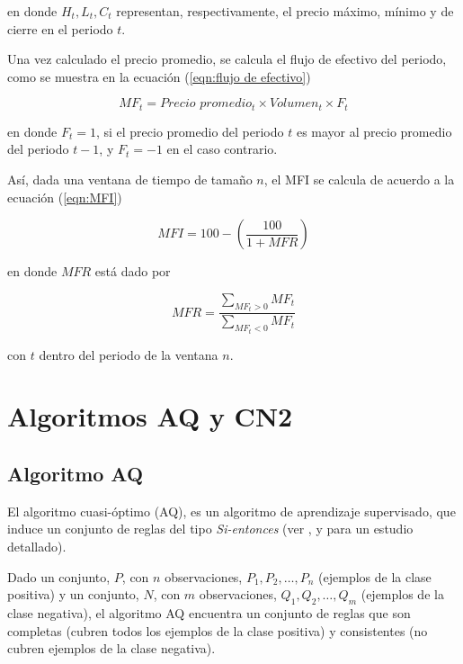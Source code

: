 \documentclass[12pt]{scrbook}
\theoremstyle{break}
\theoremstyle{break}
\begin{document}
en donde $H_{t}, L_t, C_t$ representan, respectivamente, el precio máximo, mínimo y de cierre en el periodo $t$.

Una vez calculado el precio promedio, se calcula el flujo de efectivo del periodo, como se muestra en la ecuación (\ref{eqn:flujo de efectivo})

\begin{equation} \label{eqn:flujo de efectivo}
MF_t = Precio\, \, promedio_t \times Volumen_t \times F_t
\end{equation}

en donde $F_t = 1$, si el precio promedio del periodo $t$ es mayor al precio promedio del periodo $t-1$, y $F_t = -1$ en el caso contrario.

Así, dada una ventana de tiempo de tamaño $n$, el MFI se calcula de acuerdo a la ecuación (\ref{eqn:MFI})

\begin{equation} \label{eqn:MFI}
MFI = 100 - \left( \frac{100}{1 + MFR} \right)
\end{equation}

en donde $MFR$ está dado por 

\begin{equation} \label{eqn:MFR}
MFR = \dfrac{\sum_{MF_t > 0} MF_t  }{\sum_{MF_t < 0} MF_t}
\end{equation}

con $t$ dentro del periodo de la ventana $n$.

\section{Algoritmos AQ y CN2}
\label{seccion:algoritmos aq cn2}

\subsection{Algoritmo AQ}
\label{subseccion:algoritmo aq}
El algoritmo cuasi-óptimo (AQ), es un algoritmo de aprendizaje supervisado, que induce un conjunto de reglas del tipo \textit{Si-entonces} (ver \cite{AQCervone2010}, \cite{AQMichalski1991} y \cite{AQWojtusiak2012} para un estudio detallado). 

Dado un conjunto, $P$, con $n$ observaciones, $P_1, P_2, \ldots, P_n$ (ejemplos de la clase positiva)  y un conjunto, $N$, con $m$ observaciones, $Q_1, Q_2, \ldots, Q_m$ (ejemplos de la clase negativa), el algoritmo AQ encuentra un conjunto de reglas que son completas (cubren todos los ejemplos de la clase positiva) y consistentes (no cubren ejemplos de la clase negativa).
\end{document}
